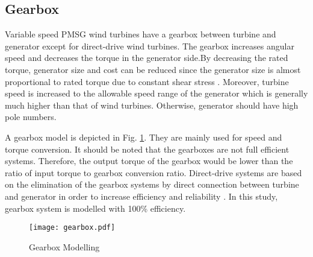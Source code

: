 \subsection{Gearbox}  
Variable speed PMSG wind turbines have a gearbox between turbine and generator except for direct-drive wind turbines. The gearbox increases angular speed and decreases the torque in the generator side.By decreasing the rated torque, generator size and cost can be reduced since the generator size is almost proportional to rated torque due to constant shear stress \cite{Polinder2013aa}. Moreover, turbine speed is increased to the allowable speed range of the generator which is generally much higher than that of wind turbines. Otherwise, generator should have high pole numbers. \par
A gearbox model is depicted in Fig. \ref{gearboxmodel}. They are mainly used for speed and torque conversion. It should be noted that the gearboxes are not full efficient systems. Therefore, the output torque of the gearbox would be lower than the ratio of input torque to gearbox conversion ratio. Direct-drive systems are based on the elimination of the gearbox systems by direct connection between turbine and generator in order to increase efficiency and reliability \cite{Chen2009b}. In this study, gearbox system is modelled with 100\% efficiency. 
\begin{figure}[h!]
	\centering
	\texttt{[image: gearbox.pdf]}
	\caption{Gearbox Modelling}
	\label{gearboxmodel}
\end{figure}

